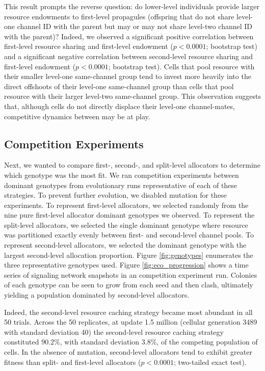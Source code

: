 This result prompts the reverse question: do lower-level individuals provide  larger resource endowments to first-level propagules (offspring that do not share level-one channel ID with the parent but may or may not share level-two channel ID with the parent)?
Indeed, we observed a significant positive correlation between first-level resource sharing and first-level endowment ($p < 0.0001$; bootstrap test) and a significant negative correlation between second-level resource sharing and first-level endowment ($p < 0.0001$; bootstrap test).
Cells that pool resource with their smaller level-one same-channel group tend to invest more heavily into the direct offshoots of their level-one same-channel group than cells that pool resource with their larger level-two same-channel group.
This observation suggests that, although cells do not directly displace their level-one channel-mates, competitive dynamics between may be at play.

\subsection{Competition Experiments}



Next, we wanted to compare first-, second-, and split-level allocators to determine which genotype was the most fit.
We ran competition experiments between dominant genotypes from evolutionary runs representative of each of these strategies.
To prevent further evolution, we disabled mutation for these experiments.
To represent first-level allocators, we selected randomly from the nine pure first-level allocator dominant genotypes we observed.
To represent the split-level allocators, we selected the single dominant genotype where resource was partitioned exactly evenly between first- and second-level channel pools.
To represent second-level allocators, we selected the dominant genotype with the largest second-level allocation proportion.
Figure \ref{fig:genotypes} enumerates the three representative genotypes used.
Figure \ref{fig:eco_progression} shows a time series of signaling network snapshots in an competition experiment run.
Colonies of each genotype can be seen to grow from each seed and then clash, ultimately yielding a population dominated by second-level allocators.

Indeed, the second-level resource caching strategy became most abundant in all 50 trials.
Across the 50 replicates, at update 1.5 million (cellular generation 3489 with standard deviation 40) the second-level resource caching strategy constituted $90.2 \%$, with standard deviation $3.8 \%$, of the competing population of cells.
In the absence of mutation, second-level allocators tend to exhibit greater fitness than split- and first-level allocators ($p < 0.0001$; two-tailed exact test).


